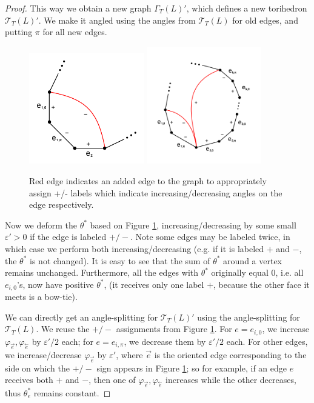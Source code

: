 \documentclass[11pt]{amsart}
\newcommand{\sT}{{\mathcal{T}}}
\newcommand{\cev}[1]{\overset{\leftarrow}{#1}}
\newcommand{\vphi}{\varphi}
\newcommand{\veps}{\varepsilon}
\theoremstyle{plain}
\theoremstyle{definition}
\begin{document}
\begin{proof}
This way we obtain a new graph $\Gamma_T(L)'$, which defines a
new torihedron $\sT_T(L)'$.
We make it angled using the angles from $\sT_T(L)$ for old edges,
and putting $\pi$ for all new edges.


\begin{figure}
\includegraphics[width=5cm]{more_pictures/one_edge.png}
\includegraphics[width=5cm]{more_pictures/two_edge_many.png}
\caption{Red edge indicates an added edge to the graph to appropriately assign +/- labels which indicate 
increasing/decreasing angles on the edge respectively.}
\label{f:adding_edges}
\end{figure}

Now we deform the $\theta^*$ based on Figure \ref{f:adding_edges},
increasing/decreasing by some small $\veps' > 0$ if the edge
is labeled $+/-$.
Note some edges may be labeled twice, in which case we perform
both increasing/decreasing (e.g. if it is labeled $+$ and $-$,
the $\theta^*$ is not changed).
It is easy to see that the sum of $\theta^*$ around a vertex
remains unchanged.
Furthermore, all the edges with $\theta^*$ originally equal 0,
i.e. all $e_{i,0}$'s,
now have positive $\theta^*$,
(it receives only one label $+$,
because the other face it meets is a bow-tie).



We can directly get an angle-splitting for $\sT_T(L)'$
using the angle-splitting for $\sT_T(L)$.
We reuse the $+/-$ assignments from Figure \ref{f:adding_edges}.
For $e = e_{i,0}$, we increase $\vphi_{\vec{e}}, \vphi_{\cev{e}}$
by $\veps'/2$ each; for $e = e_{i,\pi}$,
we decrease them by $\veps'/2$ each.
For other edges, we increase/decrease $\vphi_{\vec{e}}$ by $\veps'$,
where $\vec{e}$ is the oriented edge corresponding to the side
on which the $+/-$ sign appears in Figure \ref{f:adding_edges};
so for example, if an edge $e$ receives both $+$ and $-$,
then one of $\vphi_{\vec{e}},\vphi_{\cev{e}}$ increases
while the other decreases, thus $\theta_e^*$ remains constant.



\end{proof}
\end{document}
